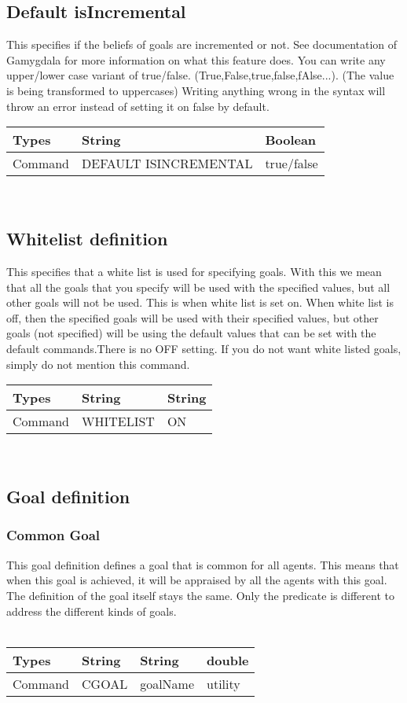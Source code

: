 \documentclass{scrartcl}
\begin{document}
\subsection{Default isIncremental}
This specifies if the beliefs of goals are incremented or not. See documentation of Gamygdala for more information on what this feature does.
You can write any upper/lower case variant of true/false. (True,False,true,false,fAlse...). (The value is being transformed to uppercases)
Writing anything wrong in the syntax will throw an error instead of setting it on false by default.\\
\begin{tabular}{|l|l|l|}
	\hline  Types & String & Boolean  \\ 
	\hline  Command & DEFAULT ISINCREMENTAL & true/false  \\ 
	\hline 
\end{tabular}
\\
\subsection{Whitelist definition}
This specifies that a white list is used for specifying goals. With this we mean that all the goals that you specify will be used with the specified values, but all other goals will not be used. This is when white list is set on. When white list is off, then the specified goals will be used with their specified values, but other goals (not specified) will be using the default values that can be set with the default commands.There is no OFF setting. If you do not want  white listed goals, simply do not mention this command.\\
\begin{tabular}{|l|l|l|}
	\hline  Types & String & String  \\ 
	\hline  Command & WHITELIST & ON  \\ 
	\hline  
\end{tabular}
\\

\subsection{Goal definition}
\subsubsection{Common Goal}
This goal definition defines a goal that is common for all agents. This means that when this goal is achieved, it will be appraised by all the agents with this goal. The definition of the goal itself stays the same. Only the predicate is different to address the different kinds of goals.\\\
\begin{tabular}{|l|l|l|l|}
\hline  Types& String & String & double \\ 
\hline  Command & CGOAL & goalName & utility\\ 
\hline 
\end{tabular}
\\
\end{document}
